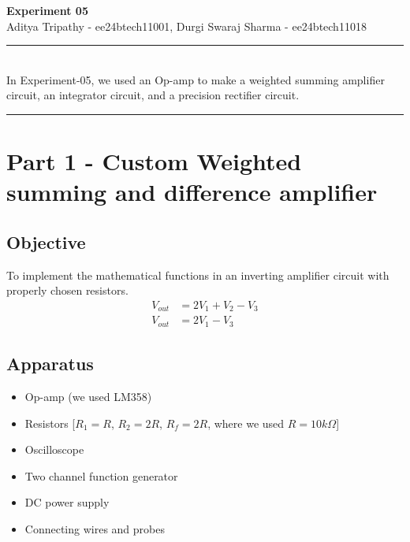\documentclass[a4paper,12pt]{article}
\renewenvironment{abstract}
 {\par\noindent\textbf{\abstractname}\ \ignorespaces \\}
 {\par\noindent\medskip}
\begin{document}
\pagestyle{fancy}
\thispagestyle{empty}
\fancyhead[L]{}
\renewcommand*{\thefootnote}{\fnsymbol{footnote}}
\begin{center}
\Large{\textbf{Experiment 05}}
\vspace{0.4cm}
\normalsize
\\ Aditya Tripathy - ee24btech11001, Durgi Swaraj Sharma - ee24btech11018\\
\medskip
\normalsize
\end{center}
{\color{gray}\hrule}
\vspace{0.4cm}
\begin{abstract}
In Experiment-05, we used an Op-amp to make a weighted summing amplifier circuit, an integrator circuit, and a precision rectifier circuit.
\end{abstract}
{\color{gray}\hrule}
\medskip
\section{Part 1 - Custom Weighted summing and difference amplifier}
\subsection{Objective}
To implement the mathematical functions in an inverting amplifier circuit with properly chosen resistors.
\begin{align*}
	V_{out} &= 2V_1+V_2-V_3\\
	V_{out} &= 2V_1-V_3
\end{align*}
\subsection{Apparatus}
\begin{itemize}
	\item Op-amp (we used LM358)
	\item Resistors [$R_1=R$, $R_2=2R$, $R_f=2R$, where we used $R = 10k\Omega$]
	\item Oscilloscope
	\item Two channel function generator
	\item DC power supply	
	\item Connecting wires and probes
\end{itemize}
\end{document}
